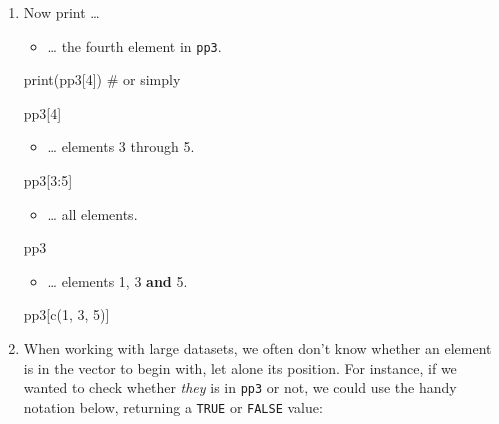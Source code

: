 \documentclass[
  11pt,
  letterpaper,
  DIV=11,
  numbers=noendperiod]{scrreprt}
\newenvironment{Shaded}{\begin{snugshade}}{\end{snugshade}}
\newcommand{\CommentTok}[1]{\textcolor[rgb]{0.37,0.37,0.37}{#1}}
\newcommand{\DecValTok}[1]{\textcolor[rgb]{0.68,0.00,0.00}{#1}}
\newcommand{\FunctionTok}[1]{\textcolor[rgb]{0.28,0.35,0.67}{#1}}
\newcommand{\NormalTok}[1]{\textcolor[rgb]{0.00,0.23,0.31}{#1}}
\newcommand{\SpecialCharTok}[1]{\textcolor[rgb]{0.37,0.37,0.37}{#1}}
\providecommand{\tightlist}{%
  \setlength{\itemsep}{0pt}\setlength{\parskip}{0pt}}\usepackage{longtable,booktabs,array}
\begin{document}
\begin{enumerate}
\def\labelenumi{\arabic{enumi}.}
\setcounter{enumi}{1}
\item
  Now print \ldots{}

  \begin{itemize}
  \tightlist
  \item
    \ldots{} the fourth element in \texttt{pp3}.
  \end{itemize}

\begin{Shaded}
\begin{Highlighting}[]
\FunctionTok{print}\NormalTok{(pp3[}\DecValTok{4}\NormalTok{]) }\CommentTok{\# or simply}

\NormalTok{pp3[}\DecValTok{4}\NormalTok{]}
\end{Highlighting}
\end{Shaded}

  \begin{itemize}
  \tightlist
  \item
    \ldots{} elements 3 through 5.
  \end{itemize}

\begin{Shaded}
\begin{Highlighting}[]
\NormalTok{pp3[}\DecValTok{3}\SpecialCharTok{:}\DecValTok{5}\NormalTok{]}
\end{Highlighting}
\end{Shaded}

  \begin{itemize}
  \tightlist
  \item
    \ldots{} all elements.
  \end{itemize}

\begin{Shaded}
\begin{Highlighting}[]
\NormalTok{pp3}
\end{Highlighting}
\end{Shaded}

  \begin{itemize}
  \tightlist
  \item
    \ldots{} elements 1, 3 \textbf{and} 5.
  \end{itemize}

\begin{Shaded}
\begin{Highlighting}[]
\NormalTok{pp3[}\FunctionTok{c}\NormalTok{(}\DecValTok{1}\NormalTok{, }\DecValTok{3}\NormalTok{, }\DecValTok{5}\NormalTok{)]}
\end{Highlighting}
\end{Shaded}
\item
  When working with large datasets, we often don't know whether an
  element is in the vector to begin with, let alone its position. For
  instance, if we wanted to check whether \emph{they} is in \texttt{pp3}
  or not, we could use the handy notation below, returning a
  \texttt{TRUE} or \texttt{FALSE} value:
\end{enumerate}
\end{document}
